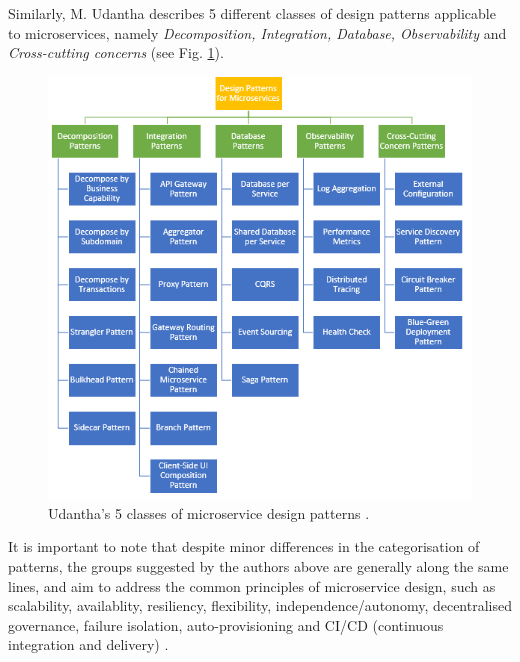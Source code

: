 Similarly, M. Udantha describes 5 different classes of design patterns applicable to microservices, namely \textit{Decomposition, Integration, Database, Observability} and \textit{Cross-cutting concerns} (see Fig. \ref{fig:udantha-patterns}). 

\begin{figure}[h]
    \centering
  \includegraphics[width=0.6\linewidth]{./assets/images/related-work/udantha-patterns}
  \caption{Udantha's 5 classes of microservice design patterns \cite{udantha19}.}
  \label{fig:udantha-patterns}
\end{figure}

It is important to note that despite minor differences in the categorisation of patterns, the groups suggested by the authors above are generally along the same lines, and aim to address the common principles of microservice design, such as scalability, availablity, resiliency, flexibility, independence/autonomy, decentralised governance, failure isolation, auto-provisioning and CI/CD (continuous integration and delivery) \cite{udantha19}.

